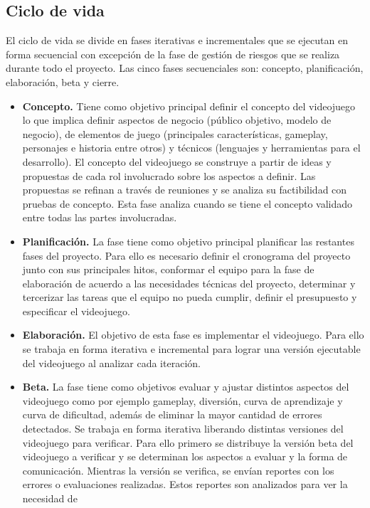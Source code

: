 \documentclass[a4paper, openright, 12pt]{report}
\begin{document}
\subsection*{Ciclo de vida}
\justify
El ciclo de vida se divide en fases iterativas e incrementales que se ejecutan en
forma secuencial con excepción de la fase de gestión de riesgos que se realiza durante todo el proyecto. Las cinco fases secuenciales son: concepto, planificación, elaboración, beta y cierre. \cite{Acerenza2009} 
\begin{itemize}
\item \textbf{Concepto.} Tiene como objetivo principal definir el concepto del videojuego lo que implica definir aspectos de negocio (público objetivo, modelo de negocio), de elementos de juego (principales características, gameplay, personajes e historia entre otros) y técnicos (lenguajes y herramientas para el
desarrollo). El concepto del videojuego se construye a partir de ideas y propuestas de cada rol involucrado sobre los aspectos a definir. Las propuestas
se refinan a través de reuniones y se analiza su factibilidad con pruebas de
concepto. Esta fase analiza cuando se tiene el concepto validado entre todas
las partes involucradas. \cite{Acerenza2009}
\item \textbf{Planificación.} La fase tiene como objetivo principal planificar las restantes fases del proyecto. Para ello es necesario definir el cronograma del proyecto junto con sus principales hitos, conformar el equipo para la fase de elaboración de acuerdo a las necesidades técnicas del proyecto, determinar y
tercerizar las tareas que el equipo no pueda cumplir, definir el presupuesto
y especificar el videojuego. \cite{Acerenza2009}
\item \textbf{Elaboración.} El objetivo de esta fase es implementar el videojuego. Para ello se trabaja en forma iterativa e incremental para lograr una versión ejecutable del videojuego al analizar cada iteración. \cite{Acerenza2009}
\item \textbf{Beta.} La fase tiene como objetivos evaluar y ajustar distintos aspectos del videojuego como por ejemplo gameplay, diversión, curva de aprendizaje y curva de dificultad, además de eliminar la mayor cantidad de errores detectados. Se trabaja en forma iterativa liberando distintas versiones del videojuego para verificar. Para ello primero se distribuye la versión beta del videojuego a verificar y se determinan los aspectos a evaluar y la forma de comunicación. Mientras la versión se verifica, se envían reportes con los errores o evaluaciones realizadas. Estos reportes son analizados para ver la necesidad de

\end{itemize}
\end{document}
